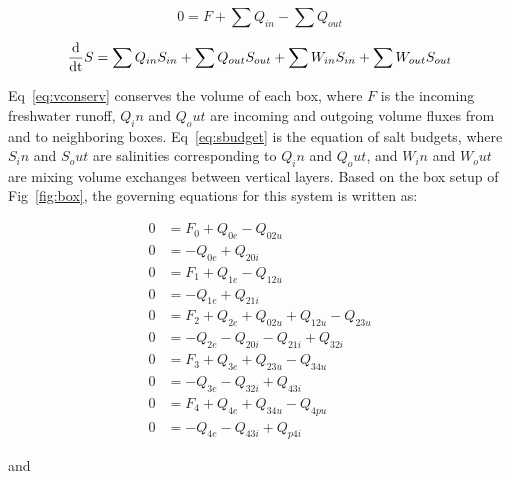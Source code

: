 \documentclass{article}
\begin{document}
\begin{equation}
  0=F+\sum Q_{in}-\sum Q_{out}
  \label{eq:vconserv}
\end{equation}

\begin{equation}
  \frac{\rm{d}}{\rm{d}t}S=\sum Q_{in}S_{in}+\sum Q_{out}S_{out}+\sum W_{in}S_{in}+\sum W_{out}S_{out}
  \label{eq:sbudget}
\end{equation}

Eq~\ref{eq:vconserv} conserves the volume of each box, where $F$ is the incoming freshwater runoff, $Q_in$ and $Q_out$ are incoming and outgoing volume fluxes from and to neighboring boxes. Eq~\ref{eq:sbudget} is the equation of salt budgets, where $S_in$ and $S_out$ are salinities corresponding to $Q_in$ and $Q_out$, and $W_in$ and $W_out$ are mixing volume exchanges between vertical layers. Based on the box setup of Fig~\ref{fig:box}, the governing equations for this system is written as:

\begin{equation}
\begin{aligned}
0 &= F_0 + Q_{0e} - Q_{02u} \\
0 &= -Q_{0e} + Q_{20i} \\
0 &= F_1 + Q_{1e} - Q_{12u} \\
0 &= -Q_{1e} + Q_{21i} \\
0 &= F_2 + Q_{2e} + Q_{02u} + Q_{12u} - Q_{23u} \\
0 &= -Q_{2e} - Q_{20i} - Q_{21i} + Q_{32i} \\
0 &= F_3 + Q_{3e} + Q_{23u} - Q_{34u} \\
0 &= -Q_{3e} - Q_{32i} + Q_{43i} \\
0 &= F_4 + Q_{4e} + Q_{34u} - Q_{4pu} \\
0 &= -Q_{4e} - Q_{43i} + Q_{p4i}
\end{aligned}
\label{eq:vconserv2}
\end{equation}

and
\end{document}
